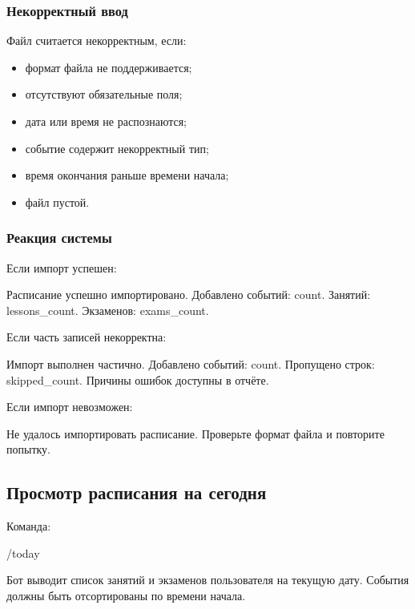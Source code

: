 \documentclass[10pt,a4paper,final]{article} %
\begin{document}
\subsubsection{Некорректный ввод}

Файл считается некорректным, если:

\begin{itemize}
    \item формат файла не поддерживается;
    \item отсутствуют обязательные поля;
    \item дата или время не распознаются;
    \item событие содержит некорректный тип;
    \item время окончания раньше времени начала;
    \item файл пустой.
\end{itemize}

\subsubsection{Реакция системы}

Если импорт успешен:

\begin{Code}
Расписание успешно импортировано.
Добавлено событий: {count}.
Занятий: {lessons_count}.
Экзаменов: {exams_count}.
\end{Code}

Если часть записей некорректна:

\begin{Code}
Импорт выполнен частично.
Добавлено событий: {count}.
Пропущено строк: {skipped_count}.
Причины ошибок доступны в отчёте.
\end{Code}

Если импорт невозможен:

\begin{Code}
Не удалось импортировать расписание. Проверьте формат файла и повторите попытку.
\end{Code}

\subsection{Просмотр расписания на сегодня}

Команда:

\begin{Code}
/today
\end{Code}

Бот выводит список занятий и экзаменов пользователя на текущую дату. События должны быть отсортированы по времени начала.
\end{document}

